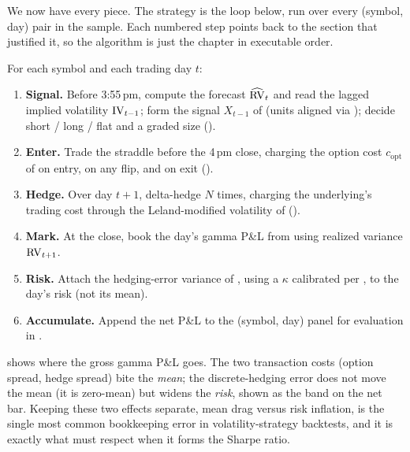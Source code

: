We now have every piece. The strategy is the loop below, run over every (symbol, day) pair in the sample. Each numbered step points back to the section that justified it, so the algorithm is just the chapter in executable order.

\begin{keyidea}
For each symbol and each trading day $t$:
\begin{enumerate}
  \item \textbf{Signal.} Before 3:55\,pm, compute the forecast $\widehat{\operatorname{RV}}_t$ and read the lagged implied volatility $\operatorname{IV}_{t-1}$; form the signal $X_{t-1}$ of  (units aligned via ); decide short / long / flat and a graded size ().
  \item \textbf{Enter.} Trade the straddle before the 4\,pm close, charging the option cost $c_{\text{opt}}$ of  on entry, on any flip, and on exit ().
  \item \textbf{Hedge.} Over day $t+1$, delta-hedge $N$ times, charging the underlying's trading cost through the Leland-modified volatility of  ().
  \item \textbf{Mark.} At the close, book the day's gamma P\&L from  using realized variance $\operatorname{RV}_{t+1}$.
  \item \textbf{Risk.} Attach the hedging-error variance of , using a $\kappa$ calibrated per , to the day's risk (not its mean).
  \item \textbf{Accumulate.} Append the net P\&L to the (symbol, day) panel for evaluation in .
\end{enumerate}
\end{keyidea}

 shows where the gross gamma P\&L goes. The two transaction costs (option spread, hedge spread) bite the \emph{mean}; the discrete-hedging error does not move the mean (it is zero-mean) but widens the \emph{risk}, shown as the band on the net bar. Keeping these two effects separate, mean drag versus risk inflation, is the single most common bookkeeping error in volatility-strategy backtests, and it is exactly what  must respect when it forms the Sharpe ratio.

